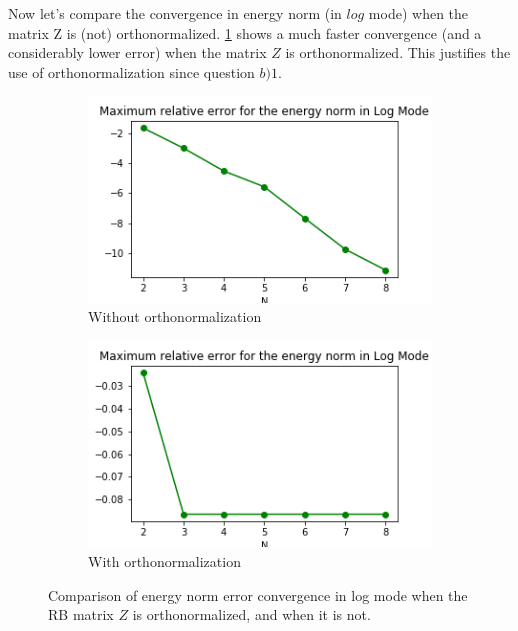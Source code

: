 \documentclass[
	english,
	11pt, %
]{fphw}
\begin{document}
Now let's compare the convergence in energy norm (in $log$ mode) when the matrix Z is (not) orthonormalized. \cref{fig:CompOrth} shows a much faster convergence (and a considerably lower error) when the matrix $Z$ is orthonormalized. This justifies the use of orthonormalization since question $b)1$.
\begin{figure}[H]
	\centering
	\begin{subfigure}[b]{0.45\textwidth}
		\centering
		\includegraphics[width=\textwidth]{sample1ErrorLog.png}
		\caption{Without orthonormalization}
	\end{subfigure}
	\begin{subfigure}[b]{0.45\textwidth}
		\centering
		\includegraphics[width=\textwidth]{sample1ErrorLogOrth.png}
		\caption{With orthonormalization}
	\end{subfigure}
	   \caption{Comparison of energy norm error convergence in log mode when the RB matrix $Z$ is orthonormalized, and when it is not.}
	   \label{fig:CompOrth}
\end{figure}
\end{document}

